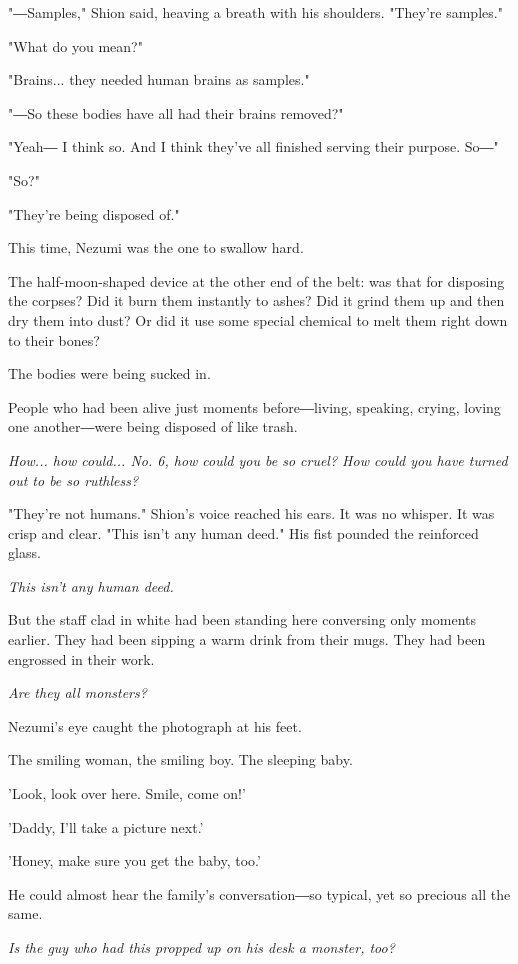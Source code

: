 "―Samples," Shion said, heaving a breath with his shoulders. "They're
samples."

"What do you mean?"

"Brains... they needed human brains as samples."

"―So these bodies have all had their brains removed?"

"Yeah― I think so. And I think they've all finished serving their
purpose. So―"

"So?"

"They're being disposed of."

This time, Nezumi was the one to swallow hard.

The half-moon-shaped device at the other end of the belt: was that for
disposing the corpses? Did it burn them instantly to ashes? Did it grind
them up and then dry them into dust? Or did it use some special chemical
to melt them right down to their bones?

The bodies were being sucked in.

People who had been alive just moments before―living, speaking, crying,
loving one another―were being disposed of like trash.

\emph{How... how could... No. 6, how could you be so cruel? How could you have
	turned out to be so ruthless?}

"They're not humans." Shion's voice reached his ears. It was no whisper.
It was crisp and clear. "This isn't any human deed." His fist pounded
the reinforced glass.

\emph{This isn't any human deed.}

But the staff clad in white had been standing here conversing only
moments earlier. They had been sipping a warm drink from their mugs.
They had been engrossed in their work.

\emph{Are they all monsters?}

Nezumi's eye caught the photograph at his feet.

The smiling woman, the smiling boy. The sleeping baby.

'Look, look over here. Smile, come on!'

'Daddy, I'll take a picture next.'

'Honey, make sure you get the baby, too.'

He could almost hear the family's conversation―so typical, yet so
precious all the same.

\emph{Is the guy who had this propped up on his desk a monster, too?}

